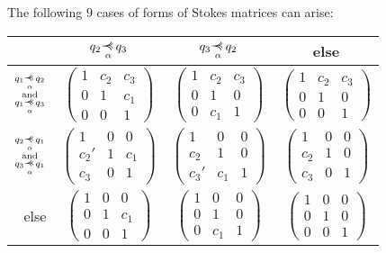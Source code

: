 The following $9$ cases of forms of Stokes matrices can arise:
\begin{center}
  \def\arraystretch{1.3}
  \setlength\tabcolsep{4mm}
  \begin{tabular}{r|c|c|c}
    & $q_2\myrel{\alpha}q_3$ & $q_3\myrel{\alpha}q_2$ & else
    \tabularnewline
    \hline
    $\substack{q_1\myrel{\alpha}q_2\\\text{and} \\q_1\myrel{\alpha}q_3}$
    & $\begin{pmatrix} 1 & c_2 & c_3 \\0 & 1 & c_1 \\0 & 0 & 1 \end{pmatrix}$
   \cellcolor{blue!15}
    & $\begin{pmatrix} 1 & c_2 & c_3 \\0 & 1 & 0 \\0 & c_1 & 1 \end{pmatrix}$
   \cellcolor{blue!15}
    & $\begin{pmatrix} 1 & c_2 & c_3 \\0 & 1 & 0 \\0 & 0 & 1 \end{pmatrix}$
   \cellcolor{green!15}
    \tabularnewline
    \hline
    $\substack{q_2\myrel{\alpha}q_1\\\text{and} \\q_3\myrel{\alpha}q_1}$
    & $\begin{pmatrix} 1 & 0 & 0 \\c_2' & 1 & c_1 \\c_3 & 0 & 1 \end{pmatrix}$
   \cellcolor{blue!15}
    & $\begin{pmatrix} 1 & 0 & 0 \\c_2 & 1 & 0 \\c_3' & c_1 & 1 \end{pmatrix}$
   \cellcolor{blue!15}
    & $\begin{pmatrix} 1 & 0 & 0 \\c_2 & 1 & 0 \\c_3 & 0 & 1 \end{pmatrix}$
   \cellcolor{green!15}
    \tabularnewline
    \hline
    else
    & $\begin{pmatrix} 1 & 0 & 0 \\0 & 1 & c_1 \\0 & 0 & 1 \end{pmatrix}$
   \cellcolor{purple!15}
    & $\begin{pmatrix} 1 & 0 & 0 \\0 & 1 & 0 \\0 & c_1 & 1 \end{pmatrix}$
   \cellcolor{purple!15}
    & $\begin{pmatrix} 1 & 0 & 0 \\0 & 1 & 0 \\0 & 0 & 1 \end{pmatrix}$
  \end{tabular}
\end{center}
